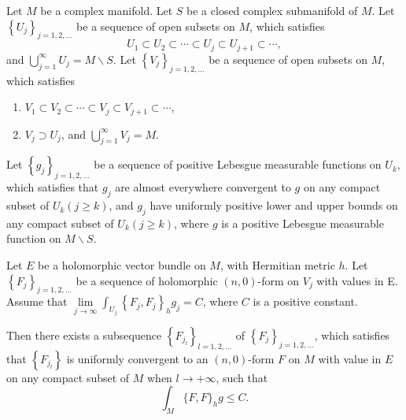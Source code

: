 \begin{lemma}
  Let $M$ be a complex manifold. Let $S$ be a closed complex submanifold of $M$. Let $\left\{U_j\right\}_{j=1,2, \ldots}$ be a sequence of open subsets on $M$, which satisfies
$$
U_1 \subset U_2 \subset \cdots \subset U_j \subset U_{j+1} \subset \cdots,
$$
and $\bigcup_{j=1}^{\infty} U_j=M \backslash S$. Let $\left\{V_j\right\}_{j=1,2, \ldots}$ be a sequence of open subsets on $M$, which satisfies
\begin{enumerate}
  \item $V_1 \subset V_2 \subset \cdots \subset V_j \subset V_{j+1} \subset \cdots$,
  \item $V_j \supset U_j $, and $\bigcup_{j=1}^{\infty} V_j=M$.
\end{enumerate}

Let $\left\{g_j\right\}_{j=1,2, \ldots}$ be a sequence of positive Lebesgue measurable functions on $U_k$, which satisfies that $g_j$ are almost everywhere convergent to $g$ on any compact subset of $U_k(j \geq k)$, and $g_j$ have uniformly positive lower and upper bounds on any compact subset of $U_k(j \geq k)$, where $g$ is a positive Lebesgue measurable function on $M \backslash S$.

Let $E$ be a holomorphic vector bundle on $M$, with Hermitian metric $h$. Let $\left\{F_j\right\}_{j=1,2, \ldots}$ be a sequence of holomorphic $(n, 0)$-form on $V_j$ with values in E. Assume that $\lim \limits_{j \rightarrow \infty} \int_{U_j}\left\{F_j, F_j\right\}_h g_j=C$, where $C$ is a positive constant.

Then there exists a subsequence $\left\{F_{j_l}\right\}_{l=1,2, \ldots}$ of $\left\{F_j\right\}_{j=1,2, \ldots}$, which satisfies that $\left\{F_{j_l}\right\}$ is uniformly convergent to an $(n, 0)$-form $F$ on $M$ with value in $E$ on any compact subset of $M$ when $l \rightarrow+\infty$, such that
$$
\int_M\{F, F\}_h g \leq C .
$$
\end{lemma}

